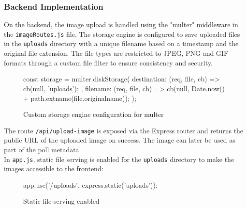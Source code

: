 \documentclass[a4paper,12pt]{report}
\begin{document}
\subsubsection{Backend Implementation}
On the backend, the image upload is handled using the "multer" middleware in the \texttt{imageRoutes.js} file. The storage engine is configured to save uploaded files in the \texttt{uploads} directory with a unique filename based on a timestamp and the original file extension. The file types are restricted to JPEG, PNG and GIF formats through a custom file filter to ensure consistency and security. \parencite{expressmulter}
\begin{figure}[H]
	\begin{code}
		const storage = multer.diskStorage({
			destination: (req, file, cb) => {
				cb(null, 'uploads');
			},
			filename: (req, file, cb) => {
				cb(null, Date.now() + path.extname(file.originalname));
			}
		});
	\end{code}
	\caption{Custom storage engine configuration for multer}
	\label{fig:multer_config}
\end{figure}
\noindent
The route \texttt{/api/upload-image} is exposed via the Express router and returns the public URL of the uploaded image on success. The image can later be used as part of the poll metadata.\\
In \texttt{app.js}, static file serving is enabled for the \texttt{uploads} directory to make the images accessible to the frontend:
\begin{figure}[H]
	\begin{code}
		app.use('/uploads', express.static('uploads'));
	\end{code}
	\caption{Static file serving enabled}
	\label{fig:static_file_serving}
\end{figure}
\end{document}
